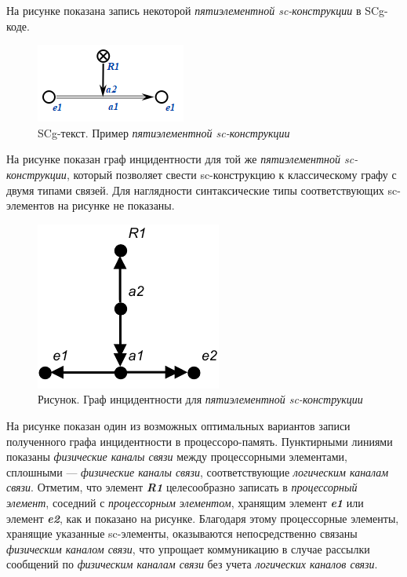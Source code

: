 На рисунке \textit{} показана запись некоторой \textit{пятиэлементной sc-конструкции} в SCg-коде.

\begin{figure}[H]
	\includegraphics[scale=0.8]{images/part6/chapter_computer/computer graph1.png}
	\caption{SCg-текст. Пример \textit{пятиэлементной sc-конструкции}}
	\label{fig:computer-graph1}
\end{figure}

На рисунке \textit{} показан граф инцидентности для той же \textit{пятиэлементной sc-конструкции}, который позволяет свести sc-конструкцию к классическому графу с двумя типами связей. Для наглядности синтаксические типы соответствующих sc-элементов на рисунке не показаны.

\begin{figure}[H]
	\includegraphics[scale=1]{images/part6/chapter_computer/incidence example.pdf}
	\caption{Рисунок. Граф инцидентности для \textit{пятиэлементной sc-конструкции}}
	\label{fig:incidence-example}
\end{figure}

На рисунке \textit{} показан один из возможных оптимальных вариантов записи полученного графа инцидентности в процессоро-память. Пунктирными линиями показаны \textit{физические каналы связи} между процессорными элементами, сплошными --- \textit{физические каналы связи}, соответствующие \textit{логическим каналам связи}. Отметим, что элемент \textbf{\textit{R1}} целесообразно записать в \textit{процессорный элемент}, соседний с \textit{процессорным элементом}, хранящим элемент \textbf{\textit{e1}} или элемент \textbf{\textit{e2}}, как и показано на рисунке. Благодаря этому процессорные элементы, хранящие указанные sc-элементы, оказываются непосредственно связаны \textit{физическим каналом связи}, что упрощает коммуникацию в случае рассылки сообщений по \textit{физическим каналам связи} без учета \textit{логических каналов связи}.

